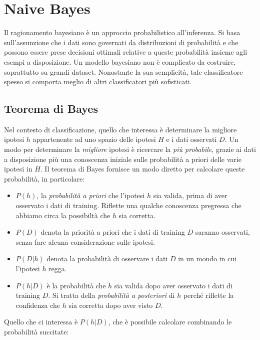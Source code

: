 \chapter{Naive Bayes}

Il ragionamento bayesiano è un approccio probabilistico all'inferenza. Si basa sull'assunzione che i dati sono governati da distribuzioni di probabilità e che possono essere prese decisioni ottimali relative a queste probabilità insieme agli esempi a disposizione. Un modello bayesiano non è complicato da costruire, soprattutto su grandi dataset. Nonostante la sua semplicità, tale classificatore spesso si comporta meglio di altri classificatori più sofisticati\cite{Domingos:1997:OSB:274158.274160}.

\section{Teorema di Bayes}
Nel contesto di classificazione, quello che interessa è determinare la migliore ipotesi $h$ appartenente ad uno spazio delle ipotesi $H$ e i dati osservati $D$. Un modo per determinare la \emph{migliore} ipotesi è ricercare la \emph{più probabile}, grazie ai dati a disposizione più una conoscenza iniziale sulle probabilità a priori delle varie ipotesi in $H$\cite{Mitchell:1997:ML:541177}. Il teorema di Bayes fornisce un modo diretto per calcolare queste probabilità, in particolare:

\begin{itemize}
	\item $P(h)$, la \emph{probabilità a priori} che l'ipotesi $h$ sia valida, prima di aver osservato i dati di training. Riflette una qualche conoscenza pregressa che abbiamo circa la possibiltà che $h$ sia corretta.
	\item $P(D)$ denota la priorità a priori che i dati di training $D$ saranno osservati, senza fare alcuna considerazione sulle ipotesi.
	\item $P(D|h)$ denota la probabilità di osservare i dati $D$ in un mondo in cui l'ipotesi $h$ regga.
	\item $P(h|D)$ è la probabilità che $h$ sia valida dopo aver osservato i dati di training $D$. Si tratta della \emph{probabilità a posteriori} di $h$ perché riflette la confidenza che $h$ sia corretta dopo aver visto $D$.
\end{itemize}

Quello che ci interessa è $P(h|D)$, che è possibile calcolare combinando le probabilità succitate:


